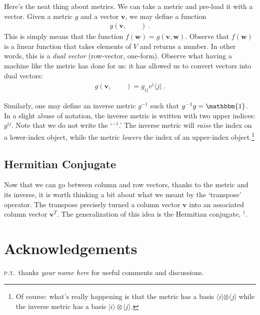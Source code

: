 \documentclass[12pt]{article}
\numberwithin{equation}{section}    %
\renewcommand{\vec}[1]{\mathbf{#1}} %
\begin{document}
Here’s the neat thing about metrics. We can take a metric and pre-load it with a vector. Given a metric $g$ and a vector $\vec{v}$, we may define a function
\begin{align}
  g(\vec v,\qquad ) \ .
\end{align}
This is simply means that the function $f(\vec{w}) = g(\vec v,\vec w)$. Observe that $f(\vec{w})$ is a linear function that takes elements of $V$ and returns a number. In other words, this is a \emph{dual vector} (row-vector, one-form). Observe what having a machine like the metric has done for us: it has allowed us to convert vectors into dual vectors:
\begin{align}
  g(\vec v,\qquad )  = g_{ij} v^i \langle j| \ .
\end{align}

Similarly, one may define an inverse metric $g^{-1}$ such that $g^{-1}g = \mathbbm{1}$. In a slight abuse of notation, the inverse metric is written with two upper indices: $g^{ij}$. Note that we do not write the `$^{-1}$.' The inverse metric will \emph{raise} the index on a lower-index object, while the metric \emph{lowers} the index of an upper-index object.\footnote{Of course: what’s really happening is that the metric has a basis $\langle i|\otimes \langle j|$ while the inverse metric has a basis $|i\rangle \otimes |j\rangle$.}


\subsection{Hermitian Conjugate}

Now that we can go between column and row vectors, thanks to the metric and its inverse, it is worth thinking a bit about what we meant by the `transpose’ operator. The transpose precisely turned a column vector $\vec{v}$ into an associated column vector $\vec{v}^T$. The generalization of this idea is the Hermitian conjugate, $^\dag$. 










\section*{Acknowledgements}


%
\textsc{p.t.}\ thanks 
\emph{your name here}
for useful comments and discussions. 
%



% 
\end{document}
